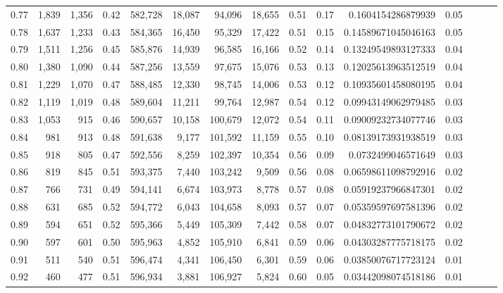\begin{tabular}{rrrrrrrrrrrrrrr}
0.77 &   1,839 &  1,356 &  0.42 &  582,728 &   18,087 &   94,096 &   18,655 &  0.51 &  0.17 &    0.1604154286879939 &      0.05 \\
0.78 &   1,637 &  1,233 &  0.43 &  584,365 &   16,450 &   95,329 &   17,422 &  0.51 &  0.15 &   0.14589671045046163 &      0.05 \\
0.79 &   1,511 &  1,256 &  0.45 &  585,876 &   14,939 &   96,585 &   16,166 &  0.52 &  0.14 &   0.13249549893127333 &      0.04 \\
0.80 &   1,380 &  1,090 &  0.44 &  587,256 &   13,559 &   97,675 &   15,076 &  0.53 &  0.13 &   0.12025613963512519 &      0.04 \\
0.81 &   1,229 &  1,070 &  0.47 &  588,485 &   12,330 &   98,745 &   14,006 &  0.53 &  0.12 &   0.10935601458080195 &      0.04 \\
0.82 &   1,119 &  1,019 &  0.48 &  589,604 &   11,211 &   99,764 &   12,987 &  0.54 &  0.12 &   0.09943149062979485 &      0.03 \\
0.83 &   1,053 &    915 &  0.46 &  590,657 &   10,158 &  100,679 &   12,072 &  0.54 &  0.11 &   0.09009232734077746 &      0.03 \\
0.84 &     981 &    913 &  0.48 &  591,638 &    9,177 &  101,592 &   11,159 &  0.55 &  0.10 &   0.08139173931938519 &      0.03 \\
0.85 &     918 &    805 &  0.47 &  592,556 &    8,259 &  102,397 &   10,354 &  0.56 &  0.09 &    0.0732499046571649 &      0.03 \\
0.86 &     819 &    845 &  0.51 &  593,375 &    7,440 &  103,242 &    9,509 &  0.56 &  0.08 &   0.06598611098792916 &      0.02 \\
0.87 &     766 &    731 &  0.49 &  594,141 &    6,674 &  103,973 &    8,778 &  0.57 &  0.08 &   0.05919237966847301 &      0.02 \\
0.88 &     631 &    685 &  0.52 &  594,772 &    6,043 &  104,658 &    8,093 &  0.57 &  0.07 &   0.05359597697581396 &      0.02 \\
0.89 &     594 &    651 &  0.52 &  595,366 &    5,449 &  105,309 &    7,442 &  0.58 &  0.07 &   0.04832773101790672 &      0.02 \\
0.90 &     597 &    601 &  0.50 &  595,963 &    4,852 &  105,910 &    6,841 &  0.59 &  0.06 &   0.04303287775718175 &      0.02 \\
0.91 &     511 &    540 &  0.51 &  596,474 &    4,341 &  106,450 &    6,301 &  0.59 &  0.06 &   0.03850076717723124 &      0.01 \\
0.92 &     460 &    477 &  0.51 &  596,934 &    3,881 &  106,927 &    5,824 &  0.60 &  0.05 &   0.03442098074518186 &      0.01 \\

\end{tabular}
